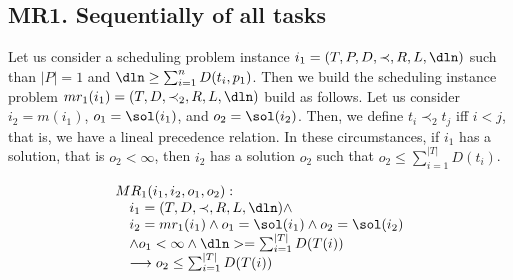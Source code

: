 

\subsection{MR1. Sequentially of all tasks}



Let us consider a scheduling problem instance $i_1 = (T, P, D, \prec, R,
L, \dln)$ such than $|P|=1$ and $\dln\geq\sum_{i=1}^{n}D(t_{i},p_{1})$.
Then we build the scheduling instance problem
$mr_{1}(i_{1})=(T, D, \prec_{2}, R, L, \dln)$ build as follows. Let us
consider $i_{2}=m(i_{1})$, $o_{1}=\sol(i_{1})$, and
$o_{2}=\sol(i_{2})$.
Then, we define $t_{i}\prec_{2} t_{j}$ iff $i<j$, that is, we have a lineal
precedence relation. In these circumstances, if $i_{1}$ has a
solution, that is $o_{2}<\infty$,
then $i_{2}$ has a solution $o_{2}$ such that
$o_{2}\leq\sum_{i=1}^{|T|}D(t_{i})$.

\begin{framed}
  \begin{displaymath}
      \begin{array}{l}
        MR_{1}(i_1,i_2,o_{1},o_{2}):\\
        \hskip 1em i_1=(T,D,\prec,R,L,\dln)\wedge  \\
        \hskip 1em i_2=mr_1(i_1)\wedge o_{1}=\sol(i_{1})\wedge o_{2}=\sol(i_2)\\
      \hskip 1em \wedge o_{1}<\infty\wedge \dln>=\sum_{i=1}^{|T|}D(T(i)) \\
      \hskip 1em \longrightarrow o_2\leq \sum_{i=1}^{|T|}D(T(i))
    \end{array}
  \end{displaymath}
\end{framed}





